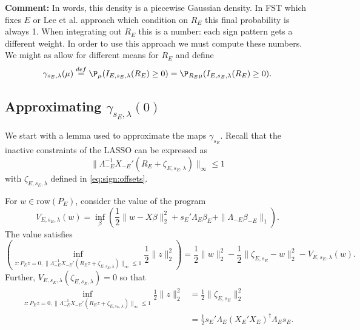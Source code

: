 \documentclass{article}
\begin{document}
        {\bf Comment:} In words, this density is a piecewise Gaussian
        density. In FST which fixes $E$ or Lee et al. approach which
        condition on $R_E$ this final probability is always 1. When
        integrating out $R_E$ this is a number: each sign pattern gets
        a different weight. In order to use this approach we must
        compute these numbers.  We might as allow for different means
        for $R_E$ and define
          \begin{equation}
            \label{eq:sign:prob}
            \gamma_{s_E,\lambda}(\mu) \overset{def}{=} \P_{\mu}(I_{E,s_E,\lambda}(R_E)
            \geq 0) = \P_{R_E\mu}(I_{E,s_E,\lambda}(R_E) \geq 0).
          \end{equation}
        
          \subsection{Approximating $\gamma_{s_E,\lambda}(0)$}

          We start with a lemma used to approximate the maps
          $\gamma_{s_E}$. Recall that the inactive constraints of the
          LASSO can be expressed as
          \begin{equation}
            \label{eq:inactive}
            \|\Lambda_{-E}^{-1}X_{-E}'(R_E + \zeta_{E,s_E,\lambda})\|_{\infty}
            \leq 1
            \end{equation}
          with $\zeta_{E,s_E,\lambda}$ defined in \eqref{eq:sign:offsets}.

          
        \begin{lemma}
          For $w \in \text{row}(P_E)$, consider the value of the
          program
          \begin{equation}
            \label{eq:dual:value}
            V_{E,s_E,\lambda}(w) = \inf_{\beta} \left(\frac{1}{2}
            \|w-X\beta\|^2_2 + s_E'\Lambda_E\beta_E +
            \|\Lambda_{-E}\beta_{-E}\|_1 \right).
          \end{equation}
The value satisfies
          \begin{equation}
            \label{eq:value:map}
\left( \inf_{z:P_Ez=0,
  \|\Lambda_{-E}^{-1}X_{-E}'(R_Ez+\zeta_{E,s_E,\lambda})\|_{\infty} \leq 1}
\frac{1}{2} \|z\|^2_2 \right) = \frac{1}{2} \|w\|^2_2 -
\frac{1}{2}\|\zeta_{E,s_E}-w\|^2_2 - V_{E,s_E,\lambda}(w).
          \end{equation}
          Further, $V_{E,s_E,\lambda}(\zeta_{E,s_E,\lambda}) = 0$ so that
          \begin{equation}
            \label{eq:LD:lasso}
            \begin{aligned}
            \inf_{z:P_Ez=0,
              \|\Lambda_{-E}^{-1}X_{-E}'(R_Ez+\zeta_{E,s_E,\lambda})\|_{\infty}
              \leq 1}\frac{1}{2} \|z\|^2_2  &= \frac{1}{2}
            \|\zeta_{E,s_E}\|^2_2 \\ &=
            \frac{1}{2}s_E'\Lambda_E(X_E'X_E)^{\dagger}\Lambda_Es_E.
          \end{aligned}
            \end{equation}
          \end{lemma}
\end{document}
